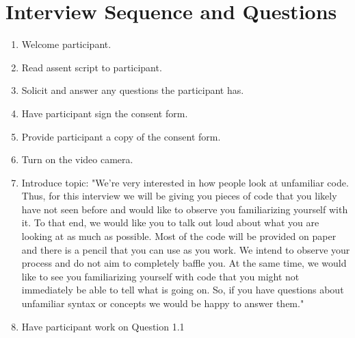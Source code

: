 \documentclass{article}
\begin{document}
\section{Interview Sequence and Questions}
\begin{enumerate}
  \item Welcome participant.
  \item Read assent script to participant.
  \item Solicit and answer any questions the participant has.
  \item Have participant sign the consent form.
  \item Provide participant a copy of the consent form.
  \item Turn on the video camera.
  \item Introduce topic: "We're very interested in how people look at unfamiliar code. Thus, for this interview we will be giving you pieces of code that you likely have not seen before and would like to observe you familiarizing yourself with it. To that end, we would like you to talk out loud about what you are looking at as much as possible. Most of the code will be provided on paper and there is a pencil that you can use as you work. We intend to observe your process and do not aim to completely baffle you. At the same time, we would like to see you familiarizing yourself with code that you might not immediately be able to tell what is going on. So, if you have questions about unfamiliar syntax or concepts we would be happy to answer them."
  \item Have participant work on Question 1.1
  

\end{enumerate}
\end{document}
